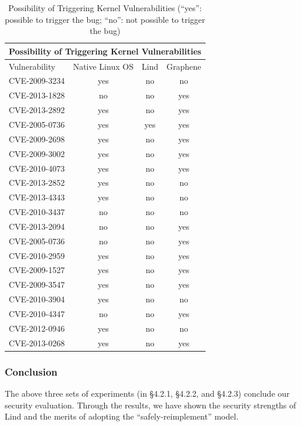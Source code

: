 \begin{table}[t]
\begin{tabular*}{\textwidth}{l @{\extracolsep{\fill}} ccc}
\toprule
\multicolumn{4}{c}{Possibility of Triggering Kernel Vulnerabilities} \\

\midrule
Vulnerability    &  Native Linux OS  &  Lind  &  Graphene \\
\midrule
 CVE-2009-3234 \cite{CVE:20093234} & yes & no & no \\
 CVE-2013-1828 \cite{CVE:20131828} & no & no & yes \\
 CVE-2013-2892 \cite{CVE:20132892} & yes & no & yes \\
 CVE-2005-0736 \cite{CVE:20050736} & yes & yes & yes \\
 CVE-2009-2698 \cite{CVE:20092698} & yes & no & yes \\
 CVE-2009-3002 \cite{CVE:20093002} & yes & no & yes \\
 CVE-2010-4073 \cite{CVE:20104073} & yes & no & yes \\
 CVE-2013-2852 \cite{CVE:20132852} & yes & no & no \\
 CVE-2013-4343 \cite{CVE:20134343} & yes & no & no \\
 CVE-2010-3437 \cite{CVE:20103437} & no & no & no \\
 CVE-2013-2094 \cite{CVE:20132094} & no & no & yes \\
 CVE-2005-0736 \cite{CVE:20050736} & no & no & yes \\
 CVE-2010-2959 \cite{CVE:20102959} & yes & no & yes \\
 CVE-2009-1527 \cite{CVE:20091527} & yes & no & yes \\
 CVE-2009-3547 \cite{CVE:20093547} & yes & no & yes \\
 CVE-2010-3904 \cite{CVE:20103904} & yes & no & no \\
 CVE-2010-4347 \cite{CVE:20104347} & no & no & yes \\
 CVE-2012-0946 \cite{CVE:20120946} & yes & no & no \\
 CVE-2013-0268 \cite{CVE:20130268} & yes & no & yes \\

\bottomrule
\end{tabular*}
\caption {Possibility of Triggering Kernel Vulnerabilities (``yes'': possible to trigger the bug; ``no'': not possible to trigger the bug)}
\label{table:trigger_vulnerabilities}
\end{table}


\subsubsection{Conclusion}
\par
The above three sets of experiments (in \S4.2.1, \S4.2.2, and \S4.2.3) conclude our security evaluation. Through the results, we have shown the security strengths of Lind and the merits of adopting the ``safely-reimplement'' model. 


